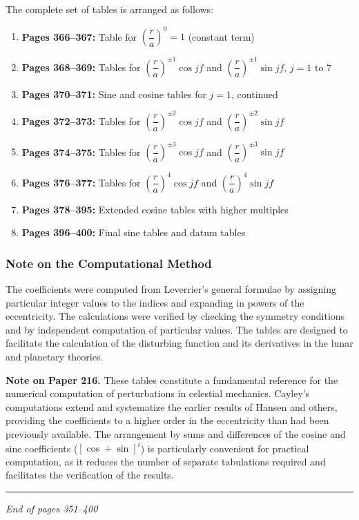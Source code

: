 \documentclass[11pt,a4paper]{article}
\begin{document}
The complete set of tables is arranged as follows:

\begin{enumerate}[leftmargin=2em]
  \item \textbf{Pages 366--367:} Table for $\left(\dfrac{r}{a}\right)^{0} = 1$ (constant term)
  \item \textbf{Pages 368--369:} Tables for $\left(\dfrac{r}{a}\right)^{\pm 1}\cos jf$ and $\left(\dfrac{r}{a}\right)^{\pm 1}\sin jf$, $j=1$ to $7$
  \item \textbf{Pages 370--371:} Sine and cosine tables for $j=1$, continued
  \item \textbf{Pages 372--373:} Tables for $\left(\dfrac{r}{a}\right)^{\pm 2}\cos jf$ and $\left(\dfrac{r}{a}\right)^{\pm 2}\sin jf$
  \item \textbf{Pages 374--375:} Tables for $\left(\dfrac{r}{a}\right)^{\pm 3}\cos jf$ and $\left(\dfrac{r}{a}\right)^{\pm 3}\sin jf$
  \item \textbf{Pages 376--377:} Tables for $\left(\dfrac{r}{a}\right)^{4}\cos jf$ and $\left(\dfrac{r}{a}\right)^{4}\sin jf$
  \item \textbf{Pages 378--395:} Extended cosine tables with higher multiples
  \item \textbf{Pages 396--400:} Final sine tables and datum tables
\end{enumerate}

\vspace{1em}

\subsubsection*{Note on the Computational Method}

The coefficients were computed from Leverrier's general formulae by assigning particular integer values to the indices and expanding in powers of the eccentricity. The calculations were verified by checking the symmetry conditions and by independent computation of particular values. The tables are designed to facilitate the calculation of the disturbing function and its derivatives in the lunar and planetary theories.

\vspace{1em}

\noindent\textbf{Note on Paper 216.} These tables constitute a fundamental reference for the numerical computation of perturbations in celestial mechanics. Cayley's computations extend and systematize the earlier results of Hansen and others, providing the coefficients to a higher order in the eccentricity than had been previously available. The arrangement by sums and differences of the cosine and sine coefficients ($[\cos+\sin]^{i}$) is particularly convenient for practical computation, as it reduces the number of separate tabulations required and facilitates the verification of the results.

\vspace{2em}

\begin{center}
\rule{0.5\textwidth}{0.4pt}

\textit{End of pages 351--400}
\end{center}
\end{document}
